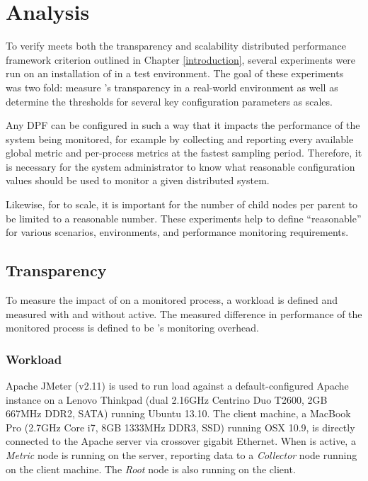 \chapter{Analysis}
\label{analysis}

To verify \dcamp meets both the transparency and scalability distributed performance framework criterion outlined in
Chapter \ref{introduction}, several experiments were run on an installation of \dcamp in a test environment. The goal of
these experiments was two fold: measure \dcampns's transparency in a real-world environment as well as determine the
thresholds for several key configuration parameters as \dcamp scales.

Any DPF can be configured in such a way that it impacts the performance of the system being monitored, for example by
collecting and reporting every available global metric and per-process metrics at the fastest sampling period.
Therefore, it is necessary for the system administrator to know what reasonable configuration values should be used to
monitor a given distributed system.

Likewise, for \dcamp to scale, it is important for the number of child nodes per parent to be limited to a reasonable
number. These experiments help to define ``reasonable'' for various scenarios, environments, and performance monitoring
requirements.

\section{Transparency}

To measure the impact of \dcamp on a monitored process, a workload is defined and measured with and without \dcamp
active. The measured difference in performance of the monitored process is defined to be \dcampns's monitoring overhead.

\subsection{Workload}

Apache JMeter\cite{jmeter} (v2.11) is used to run load against a default-configured Apache instance on a Lenovo Thinkpad
(dual 2.16GHz Centrino Duo T2600, 2GB 667MHz DDR2, SATA) running Ubuntu 13.10. The client machine, a MacBook Pro (2.7GHz
Core i7, 8GB 1333MHz DDR3, SSD) running OSX 10.9, is directly connected to the Apache server via crossover gigabit
Ethernet. When \dcamp is active, a \textit{Metric} node is running on the server, reporting data to a \textit{Collector}
node running on the client machine. The \textit{Root} node is also running on the client.


